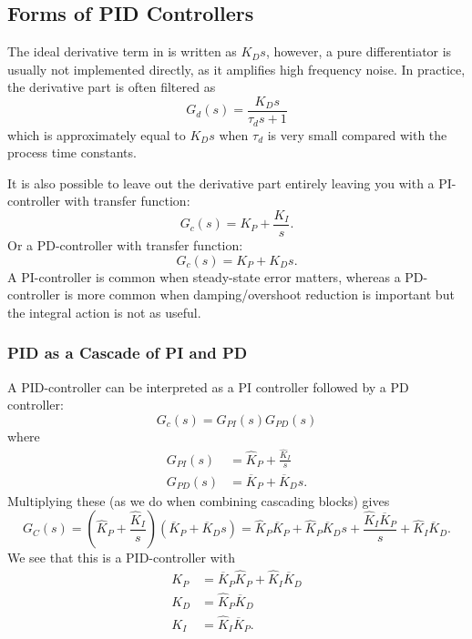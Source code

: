 \subsection{Forms of PID Controllers}
The ideal derivative term in  is written as $K_D s$, however, a pure differentiator is usually not implemented directly, as it amplifies high frequency noise.
In practice, the derivative part is often filtered as
\begin{equation*}
  G_d(s) = \frac{K_D s}{\tau_{d} s + 1}
\end{equation*}
which is approximately equal to $K_D s$ when $\tau_d$ is very small compared with the process time constants.

It is also possible to leave out the derivative part entirely leaving you with a PI-controller with transfer function:
\begin{equation*}
  G_c(s) = K_P + \frac{K_I}{s}
.\end{equation*}
Or a PD-controller with transfer function:
\begin{equation*}
  G_c(s) = K_P + K_D s
.\end{equation*}
A PI-controller is common when steady-state error matters, whereas a PD-controller is more common when damping/overshoot reduction is important but the integral action is not as useful.

\subsubsection{PID as a Cascade of PI and PD}
A PID-controller can be interpreted as a PI controller followed by a PD controller:
\begin{equation*}
  G_c(s) = G_{PI}(s) G_{PD}(s)
\end{equation*}
where
\begin{align*}
  G_{PI}(s) &= \hat{K}_P + \frac{\hat{K}_I}{s} \\
  G_{PD}(s) &= \overline{K}_P + \overline{K}_D s
.\end{align*}
Multiplying these (as we do when combining cascading blocks) gives
\begin{equation*}
  G_C(s) = \left( \hat{K}_P + \frac{\hat{K}_I}{s} \right) \left( \overline{K}_P + \overline{K}_D s \right) = \hat{K}_P \overline{K}_P + \hat{K}_P \overline{K}_Ds + \frac{\hat{K}_I \overline{K}_P}{s} + \hat{K}_I \overline{K}_D
.\end{equation*}
We see that this is a PID-controller with
\begin{align*}
  K_P &= \overline{K}_P \hat{K}_P + \hat{K}_I \overline{K}_D \\
  K_D &= \hat{K}_P \overline{K}_D \\
  K_I &= \hat{K}_I \overline{K}_P
.\end{align*}

